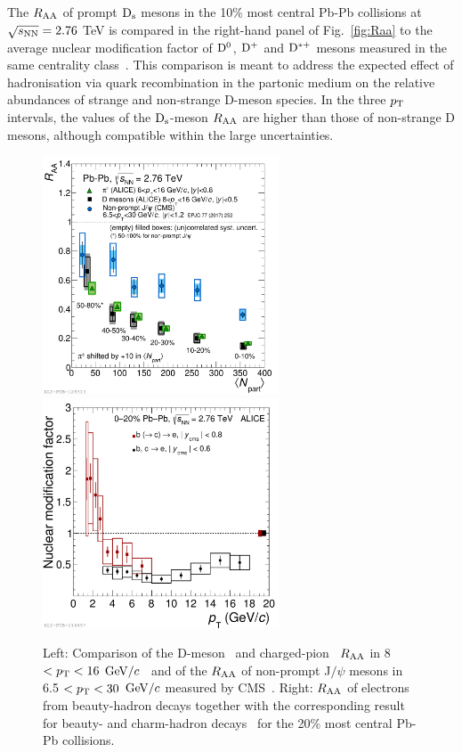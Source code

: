 The $R_{\rm AA}$ of prompt ${\rm D_s}$ mesons in the 10\% most central Pb-Pb collisions 
at $\sqrt{s_{\rm NN}} =  2.76$ TeV is compared in the right-hand panel
of Fig.~\ref{fig:Raa} to the average nuclear modification factor of 
${\rm D^0}$, ${\rm D^+}$ and ${\rm D^{*+}}$ mesons measured in the same
centrality class~\cite{Adam:2015sza}. This comparison is meant to 
address the expected effect of hadronisation via quark
recombination in the partonic medium on the relative abundances 
of strange and non-strange D-meson
species. In the three $p_{\rm T}$ intervals, the values of the ${\rm D_s}$-meson $R_{\rm AA}$ 
are higher than those of non-strange D mesons, although 
compatible within the large uncertainties. \\
\begin{figure}[!ht]
  \centering
    \includegraphics[width=7cm]{FigCap2/2017-May-22-RaavsNpart_Dmes8to16_Pions8to16_FinalNonPromptJpsi2017_CC_25042017.pdf}
    \includegraphics[width=7cm]{FigCap2/2017-Jan-28-rParAAbeautyincl.pdf}
  \caption{Left: Comparison of the D-meson~\cite{Adam:2015nna} and charged-pion~\cite{Abelev:2014laa} $R_{\rm AA}$ in 8 $< p_{\rm T} < 16$ $\mathrm{GeV}/c$~\cite{Adam:2015nna} 
and of the $R_{\rm AA}$ of non-prompt J$/\psi$ mesons in 6.5 $< p_{\rm T} < 30$ $\mathrm{GeV}/c$ measured by CMS~\cite{Khachatryan:2016ypw}. 
Right: $R_{\rm AA}$ of electrons from beauty-hadron decays together with
the corresponding result for beauty- and charm-hadron decays~\cite{Adam:2016khe} for the 20\% most central Pb-Pb collisions.}
  \label{fig:ColorMassDep}
\end{figure}


